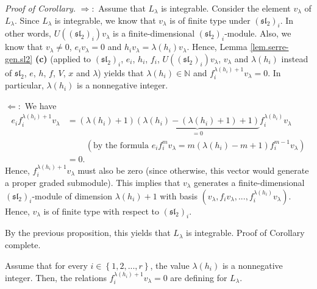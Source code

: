 \documentclass[etingof-lie.tex]{subfiles}
\begin{document}
\textit{Proof of Corollary.} $\Longrightarrow:$ Assume that $L_{\lambda}$ is
integrable. Consider the element $v_{\lambda}$ of $L_{\lambda}$. Since
$L_{\lambda}$ is integrable, we know that $v_{\lambda}$ is of finite type
under $\left(  \mathfrak{sl}_{2}\right)  _{i}$. In other words, $U\left(
\left(  \mathfrak{sl}_{2}\right)  _{i}\right)  v_{\lambda}$ is a
finite-dimensional $\left(  \mathfrak{sl}_{2}\right)  _{i}$-module. Also, we
know that $v_{\lambda}\neq0$, $e_{i}v_{\lambda}=0$ and $h_{i}v_{\lambda
}=\lambda\left(  h_{i}\right)  v_{\lambda}$. Hence, Lemma
\ref{lem.serre-gen.sl2} \textbf{(c)} (applied to $\left(  \mathfrak{sl}%
_{2}\right)  _{i}$, $e_{i}$, $h_{i}$, $f_{i}$, $U\left(  \left(
\mathfrak{sl}_{2}\right)  _{i}\right)  v_{\lambda}$, $v_{\lambda}$ and
$\lambda\left(  h_{i}\right)  $ instead of $\mathfrak{sl}_{2}$, $e$, $h$, $f$,
$V$, $x$ and $\lambda$) yields that $\lambda\left(  h_{i}\right)
\in\mathbb{N}$ and $f_{i}^{\lambda\left(  h_{i}\right)  +1}v_{\lambda}=0$. In
particular, $\lambda\left(  h_{i}\right)  $ is a nonnegative integer.

$\Longleftarrow:$ We have%
\begin{align*}
e_{i}f_{i}^{\lambda\left(  h_{i}\right)  +1}v_{\lambda}  &  =\left(
\lambda\left(  h_{i}\right)  +1\right)  \underbrace{\left(  \lambda\left(
h_{i}\right)  -\left(  \lambda\left(  h_{i}\right)  +1\right)  +1\right)
}_{=0}f_{i}^{\lambda\left(  h_{i}\right)  }v_{\lambda}\\
&  \ \ \ \ \ \ \ \ \ \ \left(  \text{by the formula }e_{i}f_{i}^{m}v_{\lambda
}=m\left(  \lambda\left(  h_{i}\right)  -m+1\right)  f_{i}^{m-1}v_{\lambda
}\right) \\
&  =0.
\end{align*}
Hence, $f_{i}^{\lambda\left(  h_{i}\right)  +1}v_{\lambda}$ must also be zero
(since otherwise, this vector would generate a proper graded submodule). This
implies that $v_{\lambda}$ generates a finite-dimensional $\left(
\mathfrak{sl}_{2}\right)  _{i}$-module of dimension $\lambda\left(
h_{i}\right)  +1$ with basis $\left(  v_{\lambda},f_{i}v_{\lambda}%
,...,f_{i}^{\lambda\left(  h_{i}\right)  }v_{\lambda}\right)  $. Hence,
$v_{\lambda}$ is of finite type with respect to $\left(  \mathfrak{sl}%
_{2}\right)  _{i}$.

By the previous proposition, this yields that $L_{\lambda}$ is integrable.
Proof of Corollary complete.

\begin{remark}
Assume that for every $i\in\left\{  1,2,...,r\right\}  $, the value
$\lambda\left(  h_{i}\right)  $ is a nonnegative integer. Then, the relations
$f_{i}^{\lambda\left(  h_{i}\right)  +1}v_{\lambda}=0$ are defining for
$L_{\lambda}$.
\end{remark}
\end{document}
